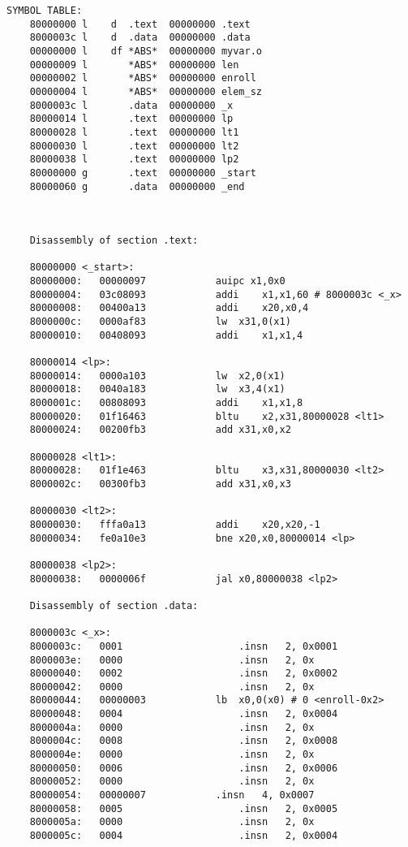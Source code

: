 \begin{lstlisting}[label=disasm,caption={Дизассемблированный код}]
	SYMBOL TABLE:
	80000000 l    d  .text	00000000 .text
	8000003c l    d  .data	00000000 .data
	00000000 l    df *ABS*	00000000 myvar.o
	00000009 l       *ABS*	00000000 len
	00000002 l       *ABS*	00000000 enroll
	00000004 l       *ABS*	00000000 elem_sz
	8000003c l       .data	00000000 _x
	80000014 l       .text	00000000 lp
	80000028 l       .text	00000000 lt1
	80000030 l       .text	00000000 lt2
	80000038 l       .text	00000000 lp2
	80000000 g       .text	00000000 _start
	80000060 g       .data	00000000 _end
	
	
	
	Disassembly of section .text:
	
	80000000 <_start>:
	80000000:	00000097          	auipc x1,0x0
	80000004:	03c08093          	addi	x1,x1,60 # 8000003c <_x>
	80000008:	00400a13          	addi	x20,x0,4
	8000000c:	0000af83          	lw	x31,0(x1)
	80000010:	00408093          	addi	x1,x1,4
	
	80000014 <lp>:
	80000014:	0000a103          	lw	x2,0(x1)
	80000018:	0040a183          	lw	x3,4(x1)
	8000001c:	00808093          	addi	x1,x1,8
	80000020:	01f16463          	bltu	x2,x31,80000028 <lt1>
	80000024:	00200fb3          	add	x31,x0,x2
	
	80000028 <lt1>:
	80000028:	01f1e463          	bltu	x3,x31,80000030 <lt2>
	8000002c:	00300fb3          	add	x31,x0,x3
	
	80000030 <lt2>:
	80000030:	fffa0a13          	addi	x20,x20,-1
	80000034:	fe0a10e3          	bne	x20,x0,80000014 <lp>
	
	80000038 <lp2>:
	80000038:	0000006f          	jal	x0,80000038 <lp2>
	
	Disassembly of section .data:
	
	8000003c <_x>:
	8000003c:	0001                	.insn	2, 0x0001
	8000003e:	0000                	.insn	2, 0x
	80000040:	0002                	.insn	2, 0x0002
	80000042:	0000                	.insn	2, 0x
	80000044:	00000003          	lb	x0,0(x0) # 0 <enroll-0x2>
	80000048:	0004                	.insn	2, 0x0004
	8000004a:	0000                	.insn	2, 0x
	8000004c:	0008                	.insn	2, 0x0008
	8000004e:	0000                	.insn	2, 0x
	80000050:	0006                	.insn	2, 0x0006
	80000052:	0000                	.insn	2, 0x
	80000054:	00000007          	.insn	4, 0x0007
	80000058:	0005                	.insn	2, 0x0005
	8000005a:	0000                	.insn	2, 0x
	8000005c:	0004                	.insn	2, 0x0004
\end{lstlisting}


